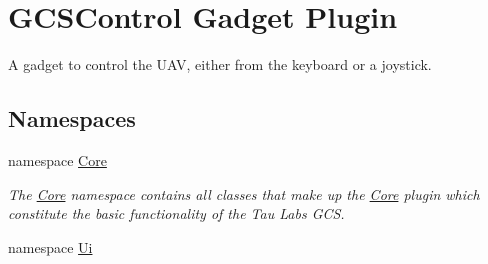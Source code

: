 \hypertarget{group___g_c_s_control_gadget_plugin}{\section{G\-C\-S\-Control Gadget Plugin}
\label{group___g_c_s_control_gadget_plugin}
}


A gadget to control the U\-A\-V, either from the keyboard or a joystick.  


\subsection*{Namespaces}
\begin{DoxyCompactItemize}
\item 
namespace \hyperlink{namespace_core}{Core}
\begin{DoxyCompactList}\small\item\em The \hyperlink{namespace_core}{Core} namespace contains all classes that make up the \hyperlink{namespace_core}{Core} plugin which constitute the basic functionality of the Tau Labs G\-C\-S. \end{DoxyCompactList}\item 
namespace \hyperlink{namespace_ui}{Ui}
\end{DoxyCompactItemize}
